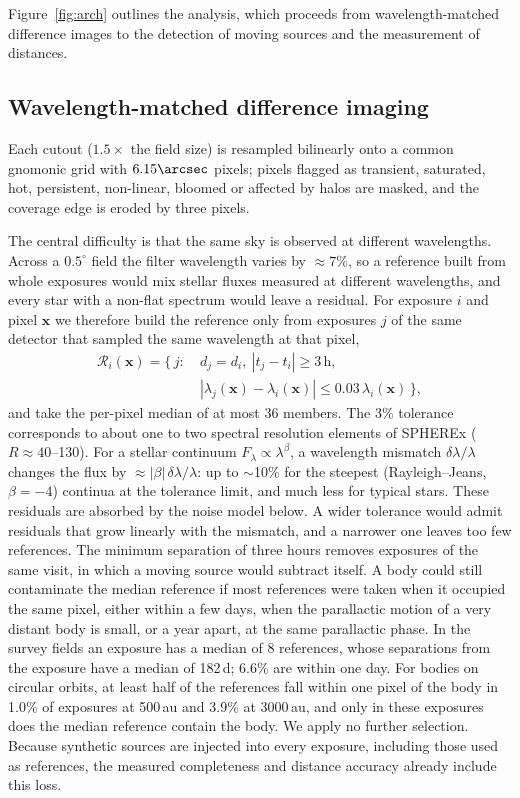 \documentclass[twocolumn,linenumbers,anonymous]{aastex702}
\begin{document}
Figure~\ref{fig:arch} outlines the analysis, which proceeds from wavelength-matched difference images to the detection of moving sources and the measurement of distances.

\subsection{Wavelength-matched difference imaging}\label{sec:diff}
Each cutout ($1.5\times$ the field size) is resampled bilinearly onto a common gnomonic grid with $6.15\arcsec$ pixels; pixels flagged as transient, saturated, hot, persistent, non-linear, bloomed or affected by halos are masked, and the coverage edge is eroded by three pixels.

The central difficulty is that the same sky is observed at different wavelengths. Across a $0.5^\circ$ field the filter wavelength varies by $\approx 7\%$, so a reference built from whole exposures would mix stellar fluxes measured at different wavelengths, and every star with a non-flat spectrum would leave a residual. For exposure $i$ and pixel $\mathbf{x}$ we therefore build the reference only from exposures $j$ of the same detector that sampled the same wavelength at that pixel,
\begin{equation}
\begin{split}
\mathcal{R}_i(\mathbf{x}) = \{\, j :\ & d_j = d_i,\ |t_j - t_i| \ge 3\,\mathrm{h},\\
& |\lambda_j(\mathbf{x}) - \lambda_i(\mathbf{x})| \le 0.03\,\lambda_i(\mathbf{x}) \,\},
\end{split}
\end{equation}
and take the per-pixel median of at most 36 members. The 3\% tolerance corresponds to about one to two spectral resolution elements of SPHEREx ($R \approx 40$--130). For a stellar continuum $F_\lambda \propto \lambda^{\beta}$, a wavelength mismatch $\delta\lambda/\lambda$ changes the flux by $\approx |\beta|\,\delta\lambda/\lambda$: up to $\sim$10\% for the steepest (Rayleigh--Jeans, $\beta = -4$) continua at the tolerance limit, and much less for typical stars. These residuals are absorbed by the noise model below. A wider tolerance would admit residuals that grow linearly with the mismatch, and a narrower one leaves too few references. The minimum separation of three hours removes exposures of the same visit, in which a moving source would subtract itself. A body could still contaminate the median reference if most references were taken when it occupied the same pixel, either within a few days, when the parallactic motion of a very distant body is small, or a year apart, at the same parallactic phase. In the survey fields an exposure has a median of 8 references, whose separations from the exposure have a median of 182\,d; 6.6\% are within one day. For bodies on circular orbits, at least half of the references fall within one pixel of the body in 1.0\% of exposures at 500\,au and 3.9\% at 3000\,au, and only in these exposures does the median reference contain the body. We apply no further selection. Because synthetic sources are injected into every exposure, including those used as references, the measured completeness and distance accuracy already include this loss.
\end{document}
